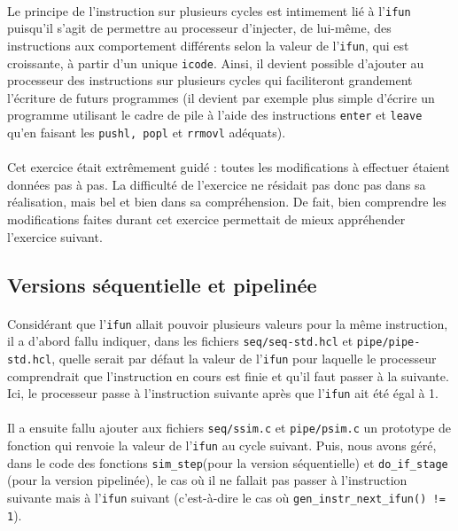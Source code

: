 \documentclass[12pt]{article}
\begin{document}
\paragraph{}Le principe de l'instruction sur plusieurs cycles est intimement lié à l'\verb+ifun+ puisqu'il s'agit de permettre au processeur d'injecter, de lui-même, des instructions aux comportement différents selon la valeur de l'\verb+ifun+, qui est croissante, à partir d'un unique \verb+icode+. Ainsi, il devient possible d'ajouter au processeur des instructions sur plusieurs cycles qui faciliteront grandement l'écriture de futurs programmes (il devient par exemple plus simple d'écrire un programme utilisant le cadre de pile à l'aide des instructions \verb+enter+ et \verb+leave+ qu'en faisant les \verb+pushl, popl+ et \verb+rrmovl+ adéquats).

\paragraph{}Cet exercice était extrêmement guidé : toutes les modifications à effectuer étaient données pas à pas. La difficulté de l'exercice ne résidait pas donc pas dans sa réalisation, mais bel et bien dans sa compréhension. De fait, bien comprendre les modifications faites durant cet exercice permettait de mieux appréhender l'exercice suivant.

\subsection{Versions séquentielle et pipelinée}
\paragraph{}Considérant que l'\verb+ifun+ allait pouvoir plusieurs valeurs pour la même instruction, il a d'abord fallu indiquer, dans les fichiers \verb+seq/seq-std.hcl+ et \verb+pipe/pipe-std.hcl+, quelle serait par défaut la valeur de l'\verb+ifun+ pour laquelle le processeur comprendrait que l'instruction en cours est finie et qu'il faut passer à la suivante. Ici, le processeur passe à l'instruction suivante après que l'\verb+ifun+ ait été égal à 1.

\paragraph{}Il a ensuite fallu ajouter aux fichiers \verb+seq/ssim.c+ et \verb+pipe/psim.c+ un prototype de fonction qui renvoie la valeur de l'\verb+ifun+ au cycle suivant. Puis, nous avons géré, dans le code des fonctions \verb+sim_step+(pour la version séquentielle) et \verb+do_if_stage+ (pour la version pipelinée), le cas où il ne fallait pas passer à l'instruction suivante mais à l'\verb+ifun+ suivant (c'est-à-dire le cas où \verb+gen_instr_next_ifun() != 1+).
\end{document}
